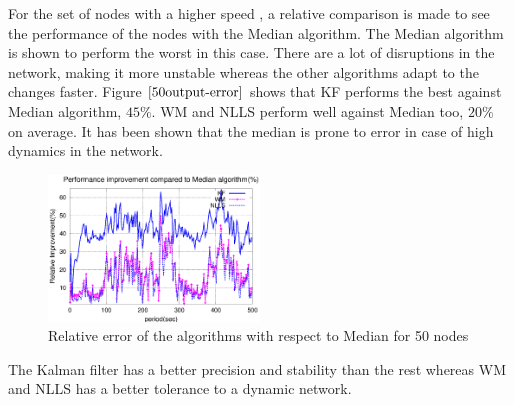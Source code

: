 \documentclass[journal]{IEEEtran}
\begin{document}
For the set of nodes with a higher speed , a relative comparison is made to see the performance of the nodes with the Median algorithm.
The Median algorithm is shown to perform the worst in this case. There are a lot of disruptions in the network, making it more unstable whereas the other algorithms adapt to the changes faster. Figure $\ref{50output-error}$ shows that KF performs the best against Median algorithm, $45\%$. WM and NLLS perform well against Median too, $20\%$ on average. It has been shown that the median is prone to error in case of high dynamics in the network.
\begin{figure}
\centering \includegraphics[width=0.5\textwidth]{50output-error}
\caption{Relative error of the algorithms with respect to Median for 50 nodes}
\label{50output-error}
\end{figure}
The Kalman filter has a better precision and stability than the rest whereas WM and NLLS has a better tolerance to a dynamic network.
\end{document}
